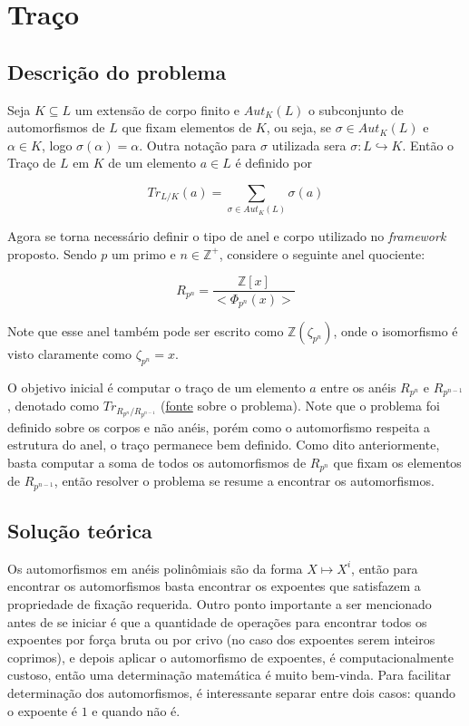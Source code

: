 \section{Traço}

\subsection{Descrição do problema}

Seja $K \subseteq L $ um extensão de corpo finito e $Aut_K(L)$ o subconjunto de automorfismos
de $L$ que fixam elementos de $K$, ou seja, se $\sigma \in Aut_K(L)$ e $\alpha \in K$, logo $\sigma(\alpha) = \alpha$.
Outra notação para $\sigma$ utilizada sera $\sigma : L \hookrightarrow K$. Então o Traço de $L$ em $K$ de um elemento
$a \in L$ é definido por 

\begin{equation}
    Tr_{L/K}(a) = \sum_{\sigma \in Aut_K(L)} \sigma(a)  
\end{equation}

Agora se torna necessário definir o tipo de anel e corpo utilizado no \textit{framework} proposto.  
Sendo $p$ um primo e $n \in \mathbb{Z}^{+}$, considere o seguinte anel quociente:

\begin{equation}
    R_{p^n} = \frac{ \mathbb{Z}[x]}{<\Phi_{p^n}(x)>}
\end{equation}

Note que esse anel também pode ser escrito como $\mathbb{Z}(\zeta_{p^n})$, onde o isomorfismo é
visto claramente como $\zeta_{p^n} = x$.

O objetivo inicial é computar o traço de um elemento $a$ entre os anéis $R_{p^n}$ e $R_{p^{n-1}}$, denotado como $Tr_{R_{p^n}/R_{p^{n-1}}}$ (\href{https://dec41.user.srcf.net/h/II_M/galois_theory/4_2}{fonte} sobre o problema).
Note que o problema foi definido sobre os corpos e não anéis, porém como o automorfismo respeita a estrutura do anel, o traço permanece bem definido.
Como dito anteriormente, basta computar a soma de todos os automorfismos de $R_{p^n}$ que fixam os elementos de $R_{p^{n-1}}$, então resolver o problema se resume a encontrar os automorfismos.

\subsection{Solução teórica}
Os automorfismos em anéis polinômiais são da forma $X \mapsto X^i$, então para encontrar os automorfismos basta encontrar os expoentes que satisfazem a propriedade de fixação requerida. 
Outro ponto importante a ser mencionado antes de se iniciar é que a quantidade de operações 
para encontrar todos os expoentes por força bruta ou por crivo (no caso dos expoentes serem inteiros
 coprimos), e depois aplicar o automorfismo de expoentes, é computacionalmente custoso, então uma determinação matemática é muito bem-vinda. 
Para facilitar determinação dos automorfismos, é interessante separar entre dois casos: quando o expoente é $1$ e quando não é.

